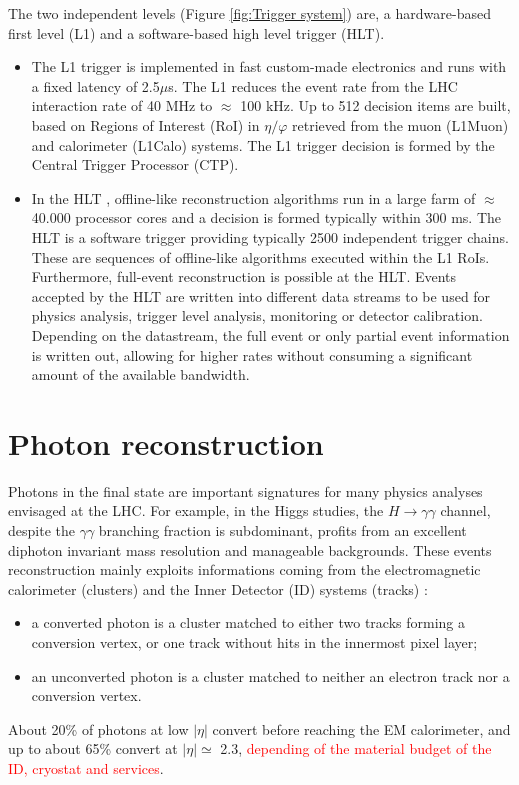 \documentclass[a4paper, oneside, 11pt, openright]{book}
\begin{document}
				The two independent levels (Figure \ref{fig:Trigger system}) are, a hardware-based first level (L1) and a software-based high level trigger (HLT). 
				\begin{itemize}
					\item The L1 trigger \cite{L1_trigger} is implemented in fast custom-made electronics and runs with a fixed latency of 2.5$\mu$s. The L1 reduces the event rate from the LHC interaction rate of 40 MHz to $\approx$ 100 kHz. Up to 512 decision items are built, based on Regions of Interest (RoI) in $\eta/\varphi$ retrieved from the muon (L1Muon) and calorimeter (L1Calo) systems. The L1 trigger decision is formed by the Central Trigger Processor (CTP). %
					
					\item In the HLT \cite{HLT_trigger}, offline-like reconstruction algorithms run in a large farm of $\approx$ 40.000 processor cores and a decision is formed typically within 300 ms. The HLT is a software trigger providing typically 2500 independent trigger chains. These are sequences of offline-like algorithms executed within the L1 RoIs. Furthermore, full-event reconstruction is possible at the HLT. Events accepted by the HLT are written into different data streams to be used for physics analysis, trigger level analysis, monitoring or detector calibration. Depending on the datastream, the full event or only partial event information is written out, allowing for higher rates without consuming a significant amount of the available bandwidth.
				\end{itemize}
		
	
	\chapter{Photon reconstruction}\label{chapter:ph_reco}
		Photons in the final state are important signatures for many physics analyses envisaged at the LHC. For example, in the Higgs studies, the $H \to \gamma\gamma$ channel, despite the $\gamma\gamma$ branching fraction is subdominant, profits from an excellent diphoton invariant mass resolution and manageable backgrounds. These events reconstruction mainly exploits informations coming from the electromagnetic calorimeter (clusters) and the Inner Detector (ID) systems (tracks) \cite{Aad_2019}:
		\begin{itemize}
			\item a converted photon is a cluster matched to either two tracks forming a conversion vertex, or one track without hits in the innermost pixel layer;
			\item an unconverted photon is a cluster matched to neither an electron track nor a conversion vertex.
		\end{itemize}
		About 20\% of photons at low $|\eta|$ convert before reaching the EM calorimeter, and up to about 65\% convert at $|\eta| \simeq$ 2.3, \textcolor{red}{depending of the material budget of the ID, cryostat and services}.
		
\end{document}
